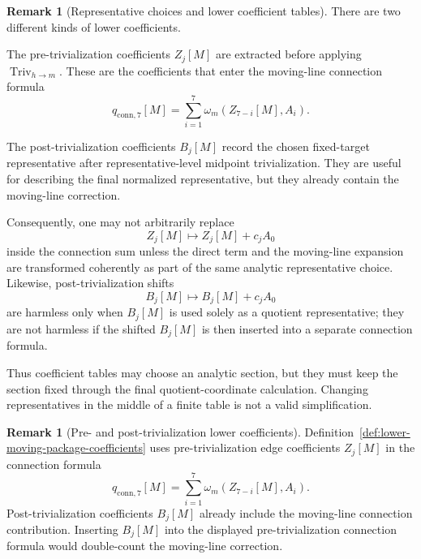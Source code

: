 \documentclass[11pt,a4paper]{amsart}
\theoremstyle{plain}
\theoremstyle{definition}
\newtheorem{remark}[theorem]{Remark}
\begin{document}
\begin{remark}[Representative choices and lower coefficient tables]
\label{rem:representative-choices-lower-coefficient-tables}
There are two different kinds of lower coefficients.

The pre-trivialization coefficients \(Z_j[M]\) are extracted before applying
\(\operatorname{Triv}_{h\to m}\).  These are the coefficients that enter the
moving-line connection formula
\[
q_{\mathrm{conn},7}[M]
=
\sum_{i=1}^{7}\omega_m(Z_{7-i}[M],A_i).
\]

The post-trivialization coefficients \(B_j[M]\) record the chosen
fixed-target representative after representative-level midpoint
trivialization.  They are useful for describing the final normalized
representative, but they already contain the moving-line correction.

Consequently, one may not arbitrarily replace
\[
Z_j[M]\mapsto Z_j[M]+c_jA_0
\]
inside the connection sum unless the direct term and the moving-line
expansion are transformed coherently as part of the same analytic
representative choice.  Likewise, post-trivialization shifts
\[
B_j[M]\mapsto B_j[M]+c_jA_0
\]
are harmless only when \(B_j[M]\) is used solely as a quotient
representative; they are not harmless if the shifted \(B_j[M]\) is then
inserted into a separate connection formula.

Thus coefficient tables may choose an analytic section, but they must keep
the section fixed through the final quotient-coordinate calculation.
Changing representatives in the middle of a finite table is not a valid
simplification.
\end{remark}

\begin{remark}[Pre- and post-trivialization lower coefficients]
\label{rem:pre-post-trivialization-lower-coefficients}
Definition~\ref{def:lower-moving-package-coefficients} uses
pre-trivialization edge coefficients \(Z_j[M]\) in the connection formula
\[
q_{\mathrm{conn},7}[M]
=
\sum_{i=1}^{7}\omega_m(Z_{7-i}[M],A_i).
\]
Post-trivialization coefficients \(B_j[M]\) already include the
moving-line connection contribution.  Inserting \(B_j[M]\) into the
displayed pre-trivialization connection formula would double-count the
moving-line correction.
\end{remark}
\end{document}
